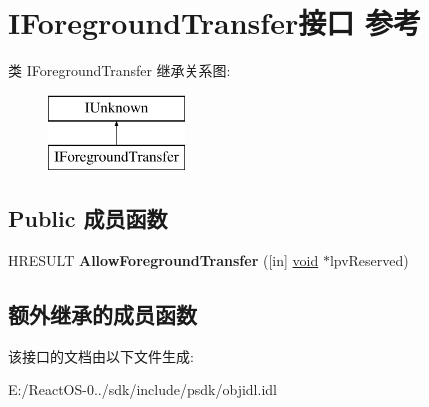 \hypertarget{interface_i_foreground_transfer}{}\section{I\+Foreground\+Transfer接口 参考}
\label{interface_i_foreground_transfer}
类 I\+Foreground\+Transfer 继承关系图\+:\begin{figure}[H]
\begin{center}
\leavevmode
\includegraphics[height=2.000000cm]{interface_i_foreground_transfer}
\end{center}
\end{figure}
\subsection*{Public 成员函数}
\begin{DoxyCompactItemize}
\item 
\mbox{\label{interface_i_foreground_transfer_acf887e8b2210e0c2cac786698507d34a}} 
H\+R\+E\+S\+U\+LT {\bfseries Allow\+Foreground\+Transfer} (\mbox{[}in\mbox{]} \hyperlink{interfacevoid}{void} $\ast$lpv\+Reserved)
\end{DoxyCompactItemize}
\subsection*{额外继承的成员函数}


该接口的文档由以下文件生成\+:\begin{DoxyCompactItemize}
\item 
E\+:/\+React\+O\+S-\/0../sdk/include/psdk/objidl.\+idl\end{DoxyCompactItemize}
